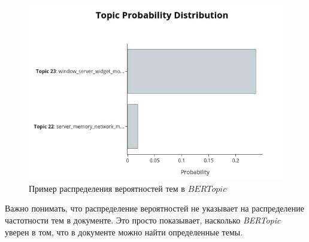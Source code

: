 \begin{figure}[H]
\centering
\includegraphics[scale=0.9]{pics/bertopic-visual-2.jpg}
\caption{Пример распределения вероятностей тем в $BERTopic$}
\end{figure}


Важно понимать, что распределение вероятностей не указывает на распределение частотности тем в документе. Это просто показывает, насколько 
\textit{BERTopic} уверен в том, что в документе можно найти определенные темы.

